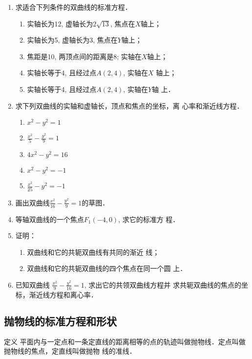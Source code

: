 \begin{ex}
\begin{enumerate}
    \item 求适合下列条件的双曲线的标准方程．
\begin{enumerate}
\item 实轴长为12, 虚轴长为$2\sqrt{13}$, 
    焦点在$X$轴上；
    \item 实轴长为5, 虚轴长为3, 焦点在$Y$轴上；
    \item 焦距是10, 两顶点间的距离是8; 
    实轴在$X$轴上；
    \item 实轴长等于4, 且经过点$A(2,4)$, 实轴在$X$
    轴上；
    \item 实轴长等于4, 且经过点$A(2,4)$, 实轴在$Y$轴
    上．
\end{enumerate}
\item 求下列双曲线的实轴和虚轴长，顶点和焦点的坐标，离
心率和渐近线方程．
\begin{multicols}{2}
\begin{enumerate}
    \item $x^2-y^2=1$
    \item $\frac{x^2}{5}-\frac{y^2}{9}=1$
    \item $4x^2-y^2=16$
    \item $x^2-y^2=-1$
    \item $\frac{x^2}{25}-y^2=-1$
\end{enumerate}
\end{multicols}

\item 画出双曲线$\frac{x^2}{16}-\frac{y^2}{9}=1$的草图．
\item 等轴双曲线的一个焦点$F_1(-4,0)$, 求它的标准方
程．
\item 证明：
\begin{enumerate}
\item 双曲线和它的共轭双曲线有共同的渐近
线；
\item 双曲线和它的共轭双曲线的四个焦点在同一个圆
上．
\end{enumerate}

\item 已知双曲线
$\frac{x^2}{9}-\frac{y^2}{16}=1$, 求出它的共领双曲线方程并
求共轭双曲线的焦点的坐标，渐近线方程和离心率．
\end{enumerate}
\end{ex}

\subsection{抛物线的标准方程和形状}
\begin{blk}
   {定义}
平面内与一定点和一条定直线的距离相等的点的轨迹叫做抛物线．定点叫做抛物线的焦点，定直线叫做抛物
线的准线．
\end{blk}

